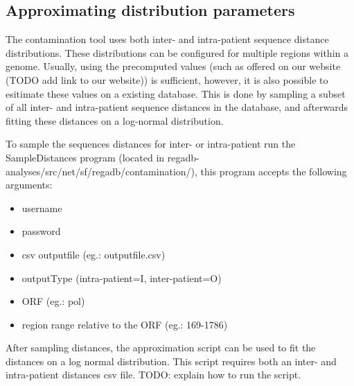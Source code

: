 \subsection{Approximating distribution parameters}
The contamination tool uses both inter- and intra-patient sequence distance distributions. These distributions can be configured for multiple regions within a genome. Usually, using the precomputed values (such as offered on our website (TODO add link to our website)) is sufficient, however, it is also possible to esitimate these values on a existing database.
This is done by sampling a subset of all inter- and intra-patient sequence distances in the database, and afterwards fitting these distances on a log-normal distribution.

To sample the sequences distances for inter- or intra-patient run the SampleDistances program (located in regadb-analyses/src/net/sf/regadb/contamination/), this program accepts the following arguments:
\begin{itemize}
\item username 
\item password 
\item csv outputfile (eg.: outputfile.csv) 
\item outputType (intra-patient=I, inter-patient=O) 
\item ORF (eg.: pol) 
\item region range relative to the ORF (eg.: 169-1786) 
\end{itemize}

After sampling distances, the approximation script can be used to fit the distances on a log normal distribution. This script requires both an inter- and intra-patient distances csv file. TODO: explain how to run the script.
